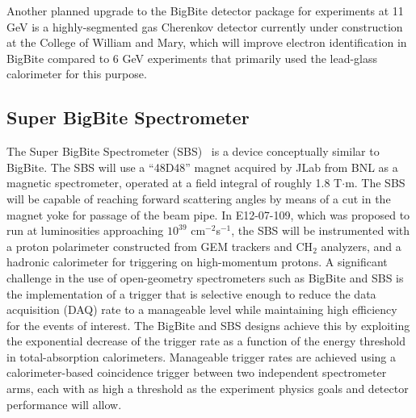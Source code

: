 Another planned upgrade to the BigBite detector package for experiments at 11 GeV is a highly-segmented gas Cherenkov detector currently under construction at the College of William and Mary, which will improve electron identification in BigBite compared to 6 GeV experiments that primarily used the lead-glass calorimeter for this purpose.
\subsection{Super BigBite Spectrometer}

The Super BigBite Spectrometer (SBS)~\cite{SBS_CDR,SBS_CDR_NEW} is a device conceptually similar to BigBite. The SBS will use a ``48D48'' magnet acquired by JLab from BNL as a magnetic spectrometer, operated at a field integral of roughly 1.8 T$\cdot$m. The SBS will be capable of reaching forward scattering angles by means of a cut in the magnet yoke for passage of the beam pipe. In E12-07-109, which was proposed to run at luminosities approaching $10^{39}$ cm$^{-2}$s$^{-1}$, the SBS will be instrumented with a proton polarimeter constructed from GEM trackers and CH$_2$ analyzers, and a hadronic calorimeter for triggering on high-momentum protons. %
A significant challenge in the use of open-geometry spectrometers such as BigBite and SBS is the implementation of a trigger that is selective enough to reduce the data acquisition (DAQ) rate to a manageable level while maintaining high efficiency for the events of interest. The BigBite and SBS designs achieve this by exploiting the exponential decrease of the trigger rate as a function of the energy threshold in total-absorption calorimeters. Manageable trigger rates are achieved using a calorimeter-based coincidence trigger between two independent spectrometer arms, each with as high a threshold as the experiment physics goals and detector performance will allow. %

